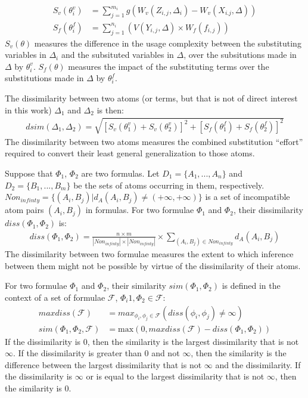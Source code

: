 \documentclass[EPiC]{easychair}
\begin{document}
\begin{align}
S_v(\theta_i^v) &= \sum_{j=1}^{m_i} g(W_v(Z_{i,j},\Delta_i) - W_v(X_{i.j},\Delta)) \\
S_f(\theta_i^f) &= \sum_{j=1}^{n_i} (V(Y_{i,j},\Delta) \times W_f(f_{i,j}))
\end{align}
$S_v(\theta)$ measures the difference in the usage complexity between
the substituting variables in $\Delta_i$ and the subsituted variables 
in $\Delta$, over the subsitutions made in $\Delta$ by $\theta_i^v$.
$S_f(\theta)$ measures the impact of the substituting terms over the 
substitutions made in $\Delta$ by $\theta_i^f$.

The dissimilarity between two atoms (or terms, but that is not of direct
interest in this work) $\Delta_1$ and $\Delta_2$ is then:
\begin{align}
dsim(\Delta_1,\Delta_2) = \sqrt{[S_v(\theta_1^v)+S_v(\theta_2^v)]^2+[S_f(\theta_1^f)+S_f(\theta_2^f)]^2}
\end{align}
The dissimilarity between two atoms measures the combined substitution
``effort'' required to convert their least general generalization to those 
atoms.

Suppose that $\Phi_1$, $\Phi_2$ are two formulas.
Let $D_1=\{A_1, ..., A_n\}$ and $D_2=\{B_1, ..., B_m\}$ be the
sets of atoms occurring in them, respectively.
$Non_{infinty}=\{(A_i,B_j) | d_A(A_i,B_j)\neq(+\infty, +\infty)\}$ is a set of
incompatible atom pairs $(A_i,B_j)$ in formulas.
For two formulae $\Phi_1$ and $\Phi_2$, their dissimilarity
$diss(\Phi_1,\Phi_2)$ is:
\begin{align}
diss(\Phi_1,\Phi_2) = \frac{n\times m}{|Non_{infinty}|\times
|Non_{infinty}|}\times \sum_{(A_i, B_j)\in Non_{infinty}}d_A(A_i, B_j)
\end{align}
The dissimilarity between two formulae measures the extent to which
inference between them might not be possible by virtue of the dissimilarity
of their atoms.

For two formulae $\Phi_1$ and $\Phi_2$, their similarity $sim(\Phi_1,\Phi_2)$
is defined in the context of a set of formulae $\mathcal{F}$, 
$\Phi_i1,\Phi_2 \in \mathcal{F}$:
\begin{align}
maxdiss(\mathcal{F}) &= max_{\phi_i,\phi_j \in \mathcal{F}} (diss(\phi_i,\phi_j) \neq \infty) \\
sim(\Phi_1,\Phi_2,\mathcal{F}) &= \textrm{max}(0, maxdiss(\mathcal{F}) - diss(\Phi_1,\Phi_2))
\end{align}
If the dissimilarity is $0$, then the similarity is the largest dissimilarity 
that is not $\infty$.
If the dissimilarity is greater than $0$ and not $\infty$, then the similarity 
is the difference between the largest dissimilarity that is not $\infty$ and 
the dissimilarity.
If the dissimilarity is $\infty$ or is equal to the largest 
dissimilarity that is not $\infty$, then the similarity is $0$.
\end{document}
